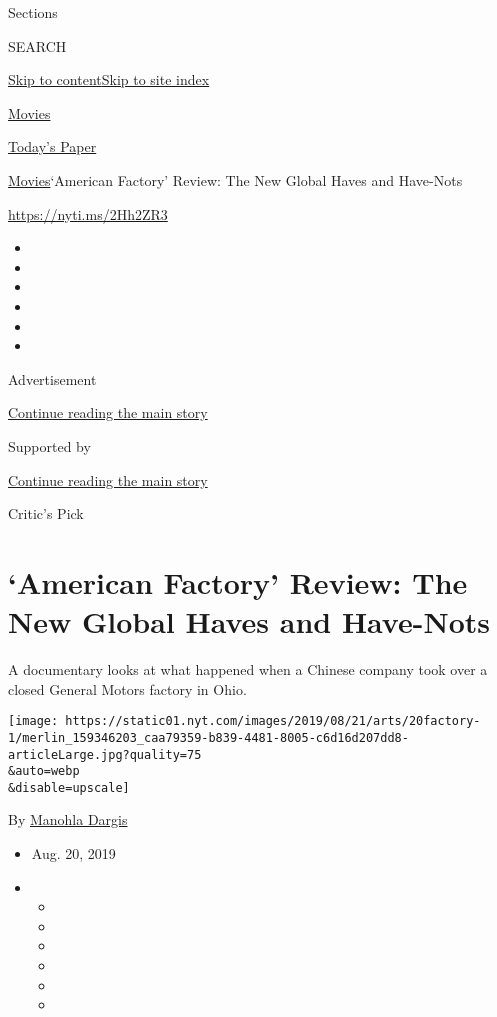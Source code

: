 Sections

SEARCH

\protect\hyperlink{site-content}{Skip to
content}\protect\hyperlink{site-index}{Skip to site index}

\href{https://www.nytimes.com/section/movies}{Movies}

\href{https://myaccount.nytimes.com/auth/login?response_type=cookie\&client_id=vi}{}

\href{https://www.nytimes.com/section/todayspaper}{Today's Paper}

\href{/section/movies}{Movies}\textbar{}`American Factory' Review: The
New Global Haves and Have-Nots

\href{https://nyti.ms/2Hh2ZR3}{https://nyti.ms/2Hh2ZR3}

\begin{itemize}
\item
\item
\item
\item
\item
\item
\end{itemize}

Advertisement

\protect\hyperlink{after-top}{Continue reading the main story}

Supported by

\protect\hyperlink{after-sponsor}{Continue reading the main story}

Critic's Pick

\hypertarget{american-factory-review-the-new-global-haves-and-have-nots}{%
\section{`American Factory' Review: The New Global Haves and
Have-Nots}\label{american-factory-review-the-new-global-haves-and-have-nots}}

A documentary looks at what happened when a Chinese company took over a
closed General Motors factory in Ohio.

\texttt{[image: https://static01.nyt.com/images/2019/08/21/arts/20factory-1/merlin\_159346203\_caa79359-b839-4481-8005-c6d16d207dd8-articleLarge.jpg?quality=75\\\&auto=webp\\\&disable=upscale]}

By \href{https://www.nytimes.com/by/manohla-dargis}{Manohla Dargis}

\begin{itemize}
\item
  Aug. 20, 2019
\item
  \begin{itemize}
  \item
  \item
  \item
  \item
  \item
  \item
  \end{itemize}
\end{itemize}

